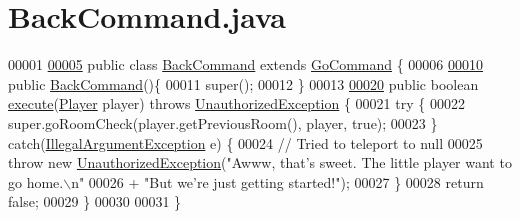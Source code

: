 \hypertarget{BackCommand_8java_source}{\section{Back\-Command.\-java}
}

\begin{DoxyCode}
00001 
\hypertarget{BackCommand_8java_source_l00005}{}\hyperlink{classBackCommand}{00005} \textcolor{keyword}{public} \textcolor{keyword}{class }\hyperlink{classBackCommand}{BackCommand} \textcolor{keyword}{extends} \hyperlink{classGoCommand}{GoCommand} \{
00006 
\hypertarget{BackCommand_8java_source_l00010}{}\hyperlink{classBackCommand_a779456e24dfb281e5917e936da5fd901}{00010}     \textcolor{keyword}{public} \hyperlink{classBackCommand_a779456e24dfb281e5917e936da5fd901}{BackCommand}()\{
00011         super();
00012     \}
00013 
\hypertarget{BackCommand_8java_source_l00020}{}\hyperlink{classBackCommand_a1f5b1ecc435b3b03d9d1a880c31c9c7a}{00020}     \textcolor{keyword}{public} \textcolor{keywordtype}{boolean} \hyperlink{classBackCommand_a1f5b1ecc435b3b03d9d1a880c31c9c7a}{execute}(\hyperlink{classPlayer}{Player} player) \textcolor{keywordflow}{throws} 
      \hyperlink{classUnauthorizedException}{UnauthorizedException} \{
00021         \textcolor{keywordflow}{try} \{
00022             super.goRoomCheck(player.getPreviousRoom(), player, \textcolor{keyword}{true});
00023         \} \textcolor{keywordflow}{catch}(\hyperlink{classIllegalArgumentException}{IllegalArgumentException} e)  \{
00024             \textcolor{comment}{// Tried to teleport to null}
00025             \textcolor{keywordflow}{throw} \textcolor{keyword}{new} \hyperlink{classUnauthorizedException}{UnauthorizedException}(\textcolor{stringliteral}{"Awww, that's sweet. The little player
       want to go home.\(\backslash\)n"}
00026                     + \textcolor{stringliteral}{"But we're just getting started!"});
00027         \}
00028         \textcolor{keywordflow}{return} \textcolor{keyword}{false};
00029     \}
00030 
00031 \}
\end{DoxyCode}
